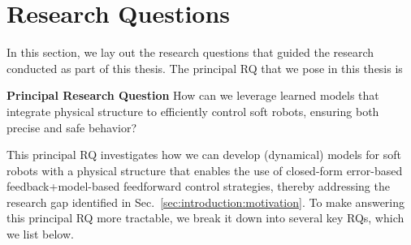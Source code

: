 \section{Research Questions}\label{sec:introduction:research_questions}
In this section, we lay out the research questions that guided the research conducted as part of this thesis.
The principal \gls{RQ} that we pose in this thesis is
\begin{titled-frame}{\textbf{Principal Research Question}}
    \noindent How can we leverage learned models that integrate physical structure to efficiently control soft robots, ensuring both precise and safe behavior?
\end{titled-frame}
This principal \gls{RQ} investigates how we can develop (dynamical) models for soft robots with a physical structure that enables the use of closed-form error-based feedback+model-based feedforward control strategies, thereby addressing the research gap identified in Sec.~\ref{sec:introduction:motivation}. To make answering this principal \gls{RQ} more tractable, we break it down into several key \glspl{RQ}, which we list below.

